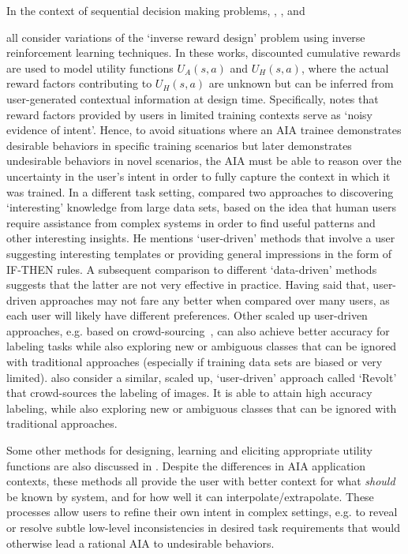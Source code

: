 In the context of sequential decision making problems, \citet{Hadfield-Menell2017-tl}, \citet{Hadfield-Menell2016-ws}, and \item \citet{Huang2017-lk} all consider variations of the `inverse reward design' problem using inverse reinforcement learning techniques. In these works, discounted cumulative rewards are used to model utility functions $U_A(s,a)$ and $U_H(s,a)$, where the actual reward factors contributing to $U_H(s,a)$ are unknown but can be inferred from user-generated contextual information at design time. Specifically, \cite{Hadfield-Menell2017-tl} notes that reward factors provided by users in limited training contexts serve as `noisy evidence of intent'. Hence, to avoid situations where an AIA trainee demonstrates desirable behaviors in specific training scenarios but later demonstrates undesirable behaviors in novel scenarios, the AIA must be able to reason over the uncertainty in the user's intent in order to fully capture the context in which it was trained. 
In a different task setting, \citet{Freitas2006-qo} compared two approaches to discovering `interesting' knowledge from large data sets, based on the idea that human users require assistance from complex systems in order to find useful patterns and other interesting insights. He mentions `user-driven' methods that involve a user suggesting interesting templates or providing general impressions in the form of IF-THEN rules. A subsequent comparison to different `data-driven' methods suggests that the latter are not very effective in practice. 
Having said that, user-driven approaches may not fare any better when compared over many users, as each user will likely have different preferences. Other scaled up user-driven approaches, e.g. based on crowd-sourcing~\citet{Chang2017-kl}, can also achieve better accuracy for labeling tasks while also exploring new or ambiguous classes that can be ignored with traditional approaches (especially if training data sets are biased or very limited). \citet{Chang2017-kl} also consider a similar, scaled up, `user-driven' approach called `Revolt' that crowd-sources the labeling of images. It is able to attain high accuracy labeling, while also exploring new or ambiguous classes that can be ignored with traditional approaches. 

Some other methods for designing, learning and eliciting appropriate utility functions are also discussed in \cite{Hadfield-Menell2016-ws,Da_Veiga2012-gh,Garcia2015-rs}.
Despite the differences in AIA application contexts, these methods all provide the user with better context for what \emph{should} be known by system, and for how well it can interpolate/extrapolate. 
These processes allow users to refine their own intent in complex settings, e.g. to reveal or resolve subtle low-level inconsistencies in desired task requirements that would otherwise lead a rational AIA to undesirable behaviors. 

